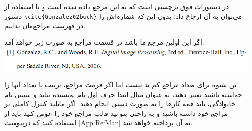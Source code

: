 در دستورات فوق   برچسبی است که به این مرجع داده شده است و با استفاده از دستور
\verb!\cite{Gonzalez02book}!
می‌توان به آن ارجاع داد؛ بدون این که شماره‌اش را در فهرست مراجع‌مان بدانیم.

اگر این اولین مرجع ما باشد در قسمت مراجع به صورت زیر خواهد آمد:\\
\includegraphics[width=\textwidth]{graphics/gonzalez.png}

این شیوه برای تعداد مراجع کم بد نیست اما اگر فرمت مراجع، ترتیب یا تعداد آنها را خواسته باشید تغییر دهید، به عنوان مثال ابتدا حرف اول نام نویسنده بیاید و سپس نام خانوادگی، باید همه کارها را به صورت دستی انجام دهید.
اگر مایلید کنترل کاملی بر مراجع خود داشته باشید و به راحتی بتوانید قالب مراجع خود را عوض کنید باید از  استفاده کنید که درپیوست  \ref{App:RefMan} به  آن پرداخته خواهد شد.
